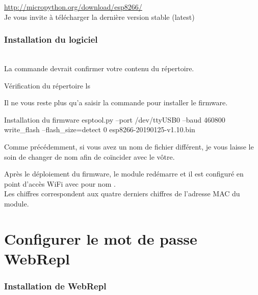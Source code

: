 \url{http://micropython.org/download/esp8266/}\\

Je vous invite à télécharger la dernière version stable (latest)


\subsection{Installation du logiciel}

 \\

La commande  devrait confirmer votre contenu du répertoire.

\begin{Bash}{Vérification du répertoire}
ls
\end{Bash}


Il ne vous reste plus qu'a saisir la commande pour installer le firmware. \\
\begin{Bash}{Installation du firmware}
esptool.py --port /dev/ttyUSB0 --baud 460800 write_flash --flash_size=detect 0 esp8266-20190125-v1.10.bin
\end{Bash}

Comme précédemment, si vous avez un nom de fichier différent, je vous laisse le soin de changer de nom afin de coïncider avec le vôtre.


Après le déploiement du firmware, le module redémarre et il est configuré en point d’accès WiFi avec pour nom . \\ Les chiffres correspondent aux quatre derniers chiffres de l'adresse MAC du module. 


\chapter{Configurer le mot de passe WebRepl}

\subsection{Installation de WebRepl}

